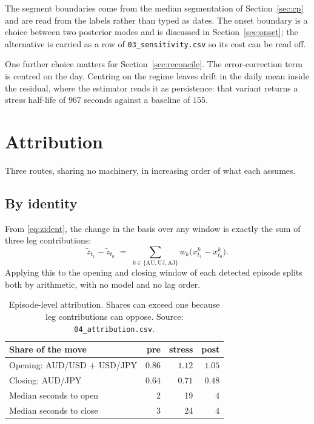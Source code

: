 \documentclass[11pt,a4paper]{article}
\newcommand{\AU}{\mathrm{AU}}
\newcommand{\UJ}{\mathrm{UJ}}
\newcommand{\AJ}{\mathrm{AJ}}
\newcommand{\code}[1]{\texttt{\small #1}}
\begin{document}
The segment boundaries come from the median segmentation of Section~\ref{sec:cp} and are
read from the labels rather than typed as dates. The onset boundary is a choice between two
posterior modes and is discussed in Section~\ref{sec:onset}; the alternative is carried as a
row of \code{03\_sensitivity.csv} so its cost can be read off.

One further choice matters for Section~\ref{sec:reconcile}. The error-correction term is
centred on the day. Centring on the regime leaves drift in the daily mean inside the residual, where
the estimator reads it as persistence: that variant returns a stress half-life of $967$
seconds against a baseline of $155$.

\section{Attribution}
\label{sec:attrib}

Three routes, sharing no machinery, in increasing order of what each assumes.

\subsection{By identity}

From \eqref{eq:zident}, the change in the basis over any window is exactly the sum of three
leg contributions:
\[
\tilde z_{t_1} - \tilde z_{t_0} \;=\; \sum_{k \in \{\AU,\UJ,\AJ\}} w_k
\bigl(x^{k}_{t_1} - x^{k}_{t_0}\bigr).
\]
Applying this to the opening and closing window of each detected episode splits both by
arithmetic, with no model and no lag order.

\begin{table}[htbp]
\centering
\small
\begin{tabular}{@{}lrrr@{}}
\toprule
Share of the move & pre & stress & post \\
\midrule
Opening: AUD/USD $+$ USD/JPY & $0.86$ & $1.12$ & $1.05$ \\
Closing: AUD/JPY             & $0.64$ & $0.71$ & $0.48$ \\
\midrule
Median seconds to open  & 2 & 19 & 4 \\
Median seconds to close & 3 & 24 & 4 \\
\bottomrule
\end{tabular}
\caption{Episode-level attribution. Shares can exceed one because leg contributions can
oppose. Source: \code{04\_attribution.csv}.}
\end{table}
\end{document}
